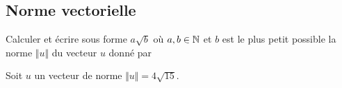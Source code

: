 \subsection{Norme vectorielle}

\begin{frame}{3}

	Calculer et écrire sous forme $a\sqrt{b}$ où $a, b\in\mathbb{N}$ et $b$ est le plus petit possible la norme $\Vert u \Vert$ du vecteur $u$ donné par
		
	\boxAB{
		\[ u = \begin{pmatrix}  3 \\ -6 \end{pmatrix}. \]
	}{
		\[ u = \begin{pmatrix} -4 \\ 2 \end{pmatrix}. \]
	}
\end{frame}

\begin{frame}{4}

	Soit $u$ un vecteur de norme $\Vert u \Vert = 4\sqrt{15}$.
	
\end{frame}



